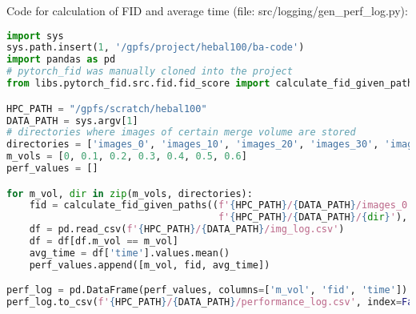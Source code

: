 \vfill
Code for calculation of FID and average time (file: src/logging/gen\_perf\_log.py):
\begin{lstlisting}[language=Python]
import sys       
sys.path.insert(1, '/gpfs/project/hebal100/ba-code')
import pandas as pd
# pytorch_fid was manually cloned into the project
from libs.pytorch_fid.src.fid.fid_score import calculate_fid_given_paths

HPC_PATH = "/gpfs/scratch/hebal100"
DATA_PATH = sys.argv[1] 
# directories where images of certain merge volume are stored
directories = ['images_0', 'images_10', 'images_20', 'images_30', 'images_40', 'images_50', 'images_60']
m_vols = [0, 0.1, 0.2, 0.3, 0.4, 0.5, 0.6]
perf_values = []

for m_vol, dir in zip(m_vols, directories):
    fid = calculate_fid_given_paths((f'{HPC_PATH}/{DATA_PATH}/images_0', 
                                     f'{HPC_PATH}/{DATA_PATH}/{dir}'), batch_size=50, device='cuda', dims=2048)
    df = pd.read_csv(f'{HPC_PATH}/{DATA_PATH}/img_log.csv')
    df = df[df.m_vol == m_vol]
    avg_time = df['time'].values.mean()
    perf_values.append([m_vol, fid, avg_time])

perf_log = pd.DataFrame(perf_values, columns=['m_vol', 'fid', 'time'])
perf_log.to_csv(f'{HPC_PATH}/{DATA_PATH}/performance_log.csv', index=False)
\end{lstlisting}
\vfill